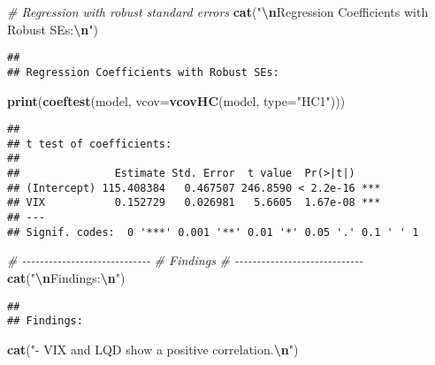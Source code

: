\documentclass[
]{article}
\newenvironment{Shaded}{\begin{snugshade}}{\end{snugshade}}
\newcommand{\AttributeTok}[1]{\textcolor[rgb]{0.13,0.29,0.53}{#1}}
\newcommand{\CommentTok}[1]{\textcolor[rgb]{0.56,0.35,0.01}{\textit{#1}}}
\newcommand{\FunctionTok}[1]{\textcolor[rgb]{0.13,0.29,0.53}{\textbf{#1}}}
\newcommand{\NormalTok}[1]{#1}
\newcommand{\SpecialCharTok}[1]{\textcolor[rgb]{0.81,0.36,0.00}{\textbf{#1}}}
\newcommand{\StringTok}[1]{\textcolor[rgb]{0.31,0.60,0.02}{#1}}
\begin{document}
\begin{Shaded}
\begin{Highlighting}[]
\CommentTok{\# Regression with robust standard errors}
\FunctionTok{cat}\NormalTok{(}\StringTok{"}\SpecialCharTok{\textbackslash{}n}\StringTok{Regression Coefficients with Robust SEs:}\SpecialCharTok{\textbackslash{}n}\StringTok{"}\NormalTok{)}
\end{Highlighting}
\end{Shaded}

\begin{verbatim}
## 
## Regression Coefficients with Robust SEs:
\end{verbatim}

\begin{Shaded}
\begin{Highlighting}[]
\FunctionTok{print}\NormalTok{(}\FunctionTok{coeftest}\NormalTok{(model, }\AttributeTok{vcov=}\FunctionTok{vcovHC}\NormalTok{(model, }\AttributeTok{type=}\StringTok{"HC1"}\NormalTok{)))}
\end{Highlighting}
\end{Shaded}

\begin{verbatim}
## 
## t test of coefficients:
## 
##               Estimate Std. Error  t value  Pr(>|t|)    
## (Intercept) 115.408384   0.467507 246.8590 < 2.2e-16 ***
## VIX           0.152729   0.026981   5.6605  1.67e-08 ***
## ---
## Signif. codes:  0 '***' 0.001 '**' 0.01 '*' 0.05 '.' 0.1 ' ' 1
\end{verbatim}

\begin{Shaded}
\begin{Highlighting}[]
\CommentTok{\# {-}{-}{-}{-}{-}{-}{-}{-}{-}{-}{-}{-}{-}{-}{-}{-}{-}{-}{-}{-}{-}{-}{-}{-}{-}{-}{-}{-}{-}}
\CommentTok{\# Findings}
\CommentTok{\# {-}{-}{-}{-}{-}{-}{-}{-}{-}{-}{-}{-}{-}{-}{-}{-}{-}{-}{-}{-}{-}{-}{-}{-}{-}{-}{-}{-}{-}}
\FunctionTok{cat}\NormalTok{(}\StringTok{"}\SpecialCharTok{\textbackslash{}n}\StringTok{Findings:}\SpecialCharTok{\textbackslash{}n}\StringTok{"}\NormalTok{)}
\end{Highlighting}
\end{Shaded}

\begin{verbatim}
## 
## Findings:
\end{verbatim}

\begin{Shaded}
\begin{Highlighting}[]
\FunctionTok{cat}\NormalTok{(}\StringTok{"{-} VIX and LQD show a positive correlation.}\SpecialCharTok{\textbackslash{}n}\StringTok{"}\NormalTok{)}
\end{Highlighting}
\end{Shaded}
\end{document}
